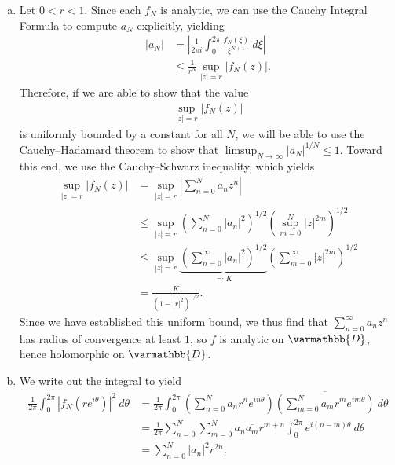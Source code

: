 \documentclass[10pt]{mypackage}
\renewcommand*{\mathbb}[1]{\varmathbb{#1}}
\begin{document}
\begin{solution}\hfill
  \begin{enumerate}[(a)]
    \item Let $ 0 < r < 1 $. Since each $f_N$ is analytic, we can use the Cauchy Integral Formula to compute $a_N$ explicitly, yielding
      \begin{align*}
        \left\vert a_N \right\vert &= \left\vert \frac{1}{2\pi i} \int_{0}^{2\pi} \frac{f_N\left( \xi \right)}{\xi^{N+1}}\:d\xi \right\vert\\
                                   &\leq \frac{1}{r^{N}} \sup_{|z| = r} \left\vert f_N\left( z \right) \right\vert.
      \end{align*}
      Therefore, if we are able to show that the value 
      \begin{align*}
        \sup_{|z| = r}\left\vert f_N\left( z \right) \right\vert
      \end{align*}
      is uniformly bounded by a constant for all $N$, we will be able to use the Cauchy--Hadamard theorem to show that $\limsup_{N\rightarrow\infty}\left\vert a_N \right\vert^{1/N}\leq 1$. Toward this end, we use the Cauchy--Schwarz inequality, which yields
      \begin{align*}
        \sup_{|z| = r} \left\vert f_N(z) \right\vert &= \sup_{|z| = r} \left\vert \sum_{n=0}^{N}a_nz^{n} \right\vert\\
                                                     &\leq \sup_{|z| = r} \left( \sum_{n=0}^{N} \left\vert a_n \right\vert^2 \right)^{1/2} \left( \sup_{m=0}^{N} \left\vert z \right\vert^{2m} \right)^{1/2}\\
                                                     &\leq \sup_{|z| = r} \underbrace{\left( \sum_{n=0}^{\infty}\left\vert a_n \right\vert^2 \right)^{1/2}}_{\eqcolon K} \left( \sum_{m=0}^{\infty}\left\vert z \right\vert^{2m} \right)^{1/2}\\
                                                     &= \frac{K}{\left( 1-|r|^2 \right)^{1/2}}.
      \end{align*}
      Since we have established this uniform bound, we thus find that $ \sum_{n=0}^{\infty}a_nz^{n} $ has radius of convergence at least $1$, so $f$ is analytic on $ \mathbb{D} $, hence holomorphic on $ \mathbb{D} $.
    \item We write out the integral to yield
      \begin{align*}
        \frac{1}{2\pi}\int_{0}^{2\pi} \left\vert f_N\left( re^{i\theta} \right) \right\vert^2\:d\theta &= \frac{1}{2\pi} \int_{0}^{2\pi} \left( \sum_{n=0}^{N} a_nr^{n}e^{in\theta} \right) \overline{\left( \sum_{m=0}^{N} a_mr^{m}e^{im\theta} \right)}\:d\theta\\
                                                                                                       &= \frac{1}{2\pi} \sum_{n=0}^{N}\sum_{m=0}^{N} a_n \overline{a_m} r^{m + n} \int_{0}^{2\pi} e^{i\left( n-m \right)\theta}\:d\theta\\
                                                                                                       &= \sum_{n=0}^{N} \left\vert a_n \right\vert^2 r^{2n}.
      \end{align*}
  \end{enumerate}
\end{solution}
\end{document}
